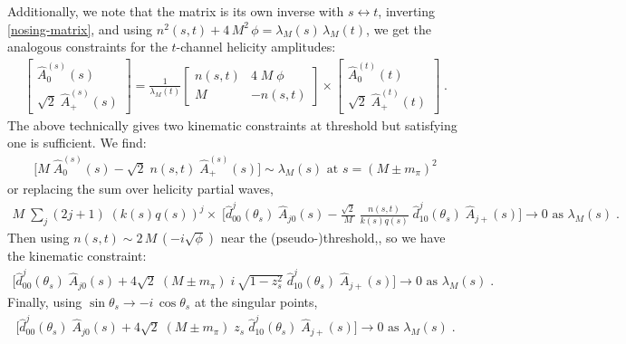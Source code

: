 Additionally, we note that the matrix is its own inverse with \(s\leftrightarrow t\), inverting \cref{nosing-matrix}, and using \(n^2(s,t) + 4 \, M^2 \, \phi = \lambda_M(s) \, \lambda_M(t)\), we get the analogous constraints for the \(t\)-channel helicity amplitudes:
  \begin{align} \label{t-nosing-matrix}
    \begin{bmatrix}
  \hat{A}^{(s)}_{0}(s) \\
  \sqrt{2} \; \hat{A}^{(s)}_{+}(s)
    \end{bmatrix}
    =
    \frac{1}{\lambda_M(t)}
    \begin{bmatrix}
        n(s,t)   &  4 \; M \; \phi \\
        M  & - n(s,t)
    \end{bmatrix}
    \times
    \begin{bmatrix}
  \hat{A}^{(t)}_{0}(t) \\
  \sqrt{2} \;  \hat{A}^{(t)}_{+}(t)
    \end{bmatrix} \; .
  \end{align}
The above technically gives two kinematic constraints at threshold but satisfying one is sufficient.
 We find:
\begin{align}
      \big[  M \; \hat{A}_0^{(s)}(s) - \sqrt{2} \; n(s,t) \; \hat{A}_+^{(s)}(s) \big]
      \sim \lambda_M(s) \text{ at } s = (M \pm m_\pi)^2
\end{align}
or replacing the sum over helicity partial waves,
\begin{align}
  M \; \sum_{j} (2j+1) \; (k(s)q(s))^j \times \; \bigg[
  \hat{d}_{00}^j(\theta_s) \; \hat{A}_{j0}(s)
  - \frac{\sqrt{2}}{M} \; \frac{n(s,t)}{k(s) q(s)} \; \hat{d}_{10}^j(\theta_s) \; \hat{A}_{j+}(s)
  \bigg] \to 0 \text{ as } \lambda_M(s) \; .
\end{align}
Then using \(n(s,t) \sim 2 \, M \, (-i \sqrt{\phi})\) near the (pseudo-)threshold,, so we have the kinematic constraint:
  \begin{align}
    \bigg[
    \hat{d}_{00}^j(\theta_s) \; \hat{A}_{j0}(s)
    + 4\sqrt{2} \; (M\pm m_\pi) \; i \, \sqrt{1 - z_s^2} \; \hat{d}_{10}^j(\theta_s) \; \hat{A}_{j+}(s)
    \bigg] \to 0 \text{ as } \lambda_M(s) \; .
  \end{align}
Finally, using \(\sin\theta_s \to - i \, \cos\theta_s\) at the singular points,
\begin{align}
  \bigg[
  \hat{d}_{00}^j(\theta_s) \; \hat{A}_{j0}(s)
  + 4\sqrt{2} \; (M\pm m_\pi) \; z_s \; \hat{d}_{10}^j(\theta_s) \; \hat{A}_{j+}(s)
  \bigg] \to 0 \text{ as } \lambda_M(s) \; .
\end{align}
